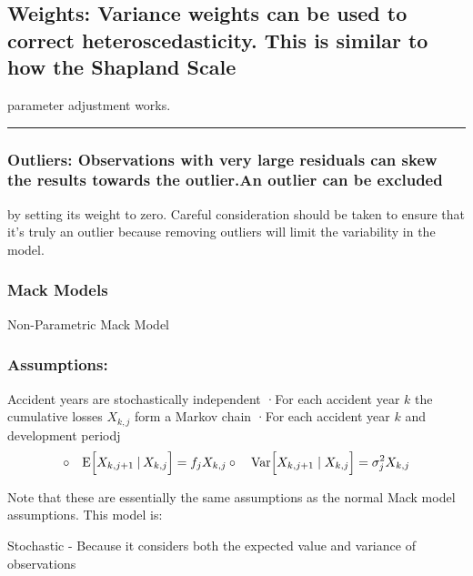 \documentclass[
]{article}
\begin{document}
\subsection{Weights: Variance weights can be used to correct
heteroscedasticity. This is similar to how the Shapland
Scale}\label{weights-variance-weights-can-be-used-to-correct-heteroscedasticity.-this-is-similar-to-how-the-shapland-scale}

parameter adjustment works.

\begin{center}\rule{0.5\linewidth}{0.5pt}\end{center}

\subsubsection{Outliers: Observations with very large residuals can skew
the results towards the outlier.An outlier can be
excluded}\label{outliers-observations-with-very-large-residuals-can-skew-the-results-towards-the-outlier.an-outlier-can-be-excluded}

by setting its weight to zero. Careful consideration should be taken to
ensure that it's truly an outlier because removing outliers will limit
the variability in the model.

\subsubsection{Mack Models}\label{mack-models}

Non-Parametric Mack Model

\subsubsection{Assumptions:}\label{assumptions-1}

Accident years are stochastically independent ·For each accident year
\(k\) the cumulative losses \(X_{k,j}\) form a Markov chain ·For each
accident year \(k\) and development periodj
\[\circ\quad\mathrm{E}\Big[X_{k,j+1}\:|\:X_{k,j}\Big]=f_{j}X_{k,j}\\\circ\quad\mathrm{Var}\Big[X_{k,j+1}\mid X_{k,j}\Big]=\sigma_{j}^{2}X_{k,j}\]

Note that these are essentially the same assumptions as the normal Mack
model assumptions. This model is:

Stochastic - Because it considers both the expected value and variance
of observations
\end{document}
